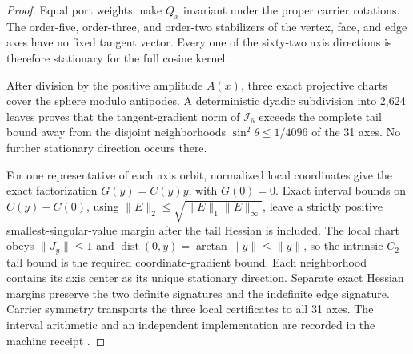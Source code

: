 \documentclass[11pt]{article}
\theoremstyle{remark}
\theoremstyle{plain}
\begin{document}
\begin{proof}
Equal port weights make \(Q_x\) invariant under the proper carrier rotations.
The order-five, order-three, and order-two stabilizers of the vertex, face,
and edge axes have no fixed tangent vector. Every one of the sixty-two axis
directions is therefore stationary for the full cosine kernel.

After division by the positive amplitude \(A(x)\), three exact projective
charts cover the sphere modulo antipodes. A deterministic dyadic subdivision
into 2,624 leaves proves that the tangent-gradient norm of \(\mathcal I_6\)
exceeds the complete tail bound away from the disjoint neighborhoods
\(\sin^2\theta\le1/4096\) of the 31 axes. No further stationary direction
occurs there.

For one representative of each axis orbit, normalized local coordinates
give the exact factorization \(G(y)=C(y)y\), with \(G(0)=0\). Exact interval
bounds on \(C(y)-C(0)\), using
\(\lVert E\rVert_2\le
\sqrt{\lVert E\rVert_1\lVert E\rVert_\infty}\), leave a strictly positive
smallest-singular-value margin after the tail Hessian is included. The local
chart obeys \(\lVert J_y\rVert\le1\) and
\(\operatorname{dist}(0,y)=\arctan\lVert y\rVert\le\lVert y\rVert\), so the
intrinsic \(C_2\) tail bound is the required coordinate-gradient bound. Each
neighborhood contains its axis center as its unique stationary direction.
Separate exact Hessian margins preserve the two definite signatures and the
indefinite edge signature. Carrier symmetry transports the three local
certificates to all 31 axes. The interval arithmetic and an independent
implementation are recorded in the machine receipt \cite{ophrepo}.
\end{proof}
\end{document}
